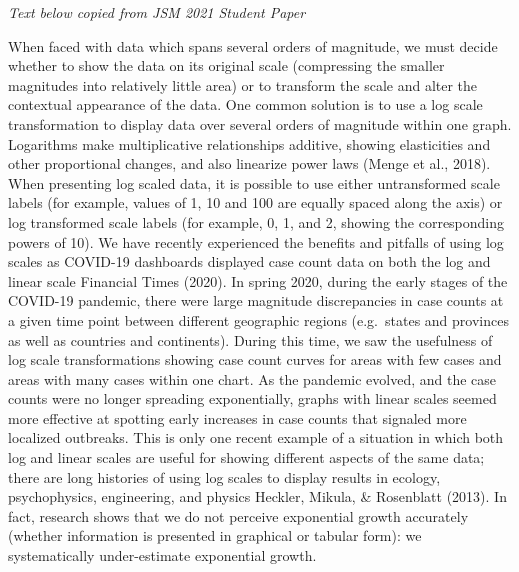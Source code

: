 \documentclass[print]{nuthesis}
\begin{document}
\emph{Text below copied from JSM 2021 Student Paper}

When faced with data which spans several orders of magnitude, we must decide whether to show the data on its original scale (compressing the smaller magnitudes into relatively little area) or to transform the scale and alter the contextual appearance of the data.
One common solution is to use a log scale transformation to display data over several orders of magnitude within one graph.
Logarithms make multiplicative relationships additive, showing elasticities and other proportional changes, and also linearize power laws (Menge et al., 2018).
When presenting log scaled data, it is possible to use either untransformed scale labels (for example, values of 1, 10 and 100 are equally spaced along the axis) or log transformed scale labels (for example, 0, 1, and 2, showing the corresponding powers of 10).
We have recently experienced the benefits and pitfalls of using log scales as COVID-19 dashboards displayed case count data on both the log and linear scale Financial Times (2020).
In spring 2020, during the early stages of the COVID-19 pandemic, there were large magnitude discrepancies in case counts at a given time point between different geographic regions (e.g.~states and provinces as well as countries and continents).
During this time, we saw the usefulness of log scale transformations showing case count curves for areas with few cases and areas with many cases within one chart.
As the pandemic evolved, and the case counts were no longer spreading exponentially, graphs with linear scales seemed more effective at spotting early increases in case counts that signaled more localized outbreaks.
This is only one recent example of a situation in which both log and linear scales are useful for showing different aspects of the same data; there are long histories of using log scales to display results in ecology, psychophysics, engineering, and physics
Heckler, Mikula, \& Rosenblatt (2013).
In fact, research shows that we do not perceive exponential growth accurately (whether information is presented in graphical or tabular form): we systematically under-estimate exponential growth.
\end{document}
